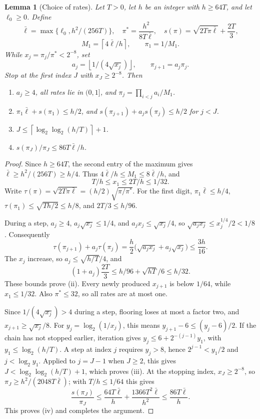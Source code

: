 \documentclass[11pt,letterpaper]{article}
\newtheorem{lemma}[theorem]{Lemma}
\theoremstyle{definition}
\theoremstyle{remark}
\newcommand{\ceil}[1]{\left\lceil #1\right\rceil}
\newcommand{\floor}[1]{\left\lfloor #1\right\rfloor}
\newcommand{\lgx}{\log_2}
\begin{document}
\begin{lemma}[Choice of rates]\label{lem:chain}
Let \(T>0\), let \(h\) be an integer with \(h\ge64T\), and let
\(\ell_0\ge0\). Define
\[
 \bar\ell=\max\{\ell_0,h^2/(256T)\},\quad
 \pi^*=\frac{h^2}{8T\bar\ell},\quad
 s(\pi)=\sqrt{2T\pi\bar\ell}+\frac{2T}{3},
\]
\[
 M_1=\ceil{4\bar\ell/h},\qquad \pi_1=1/M_1.
\]
While \(x_j=\pi_j/\pi^*<2^{-8}\), set
\[
 a_j=\floor{1/(4\sqrt{x_j})},\qquad \pi_{j+1}=a_j\pi_j.
\]
Stop at the first index \(J\) with \(x_J\ge2^{-8}\). Then
\begin{enumerate}[label=(\roman*)]
\item \(a_j\ge4\), all rates lie in \((0,1]\), and
\(\pi_j=\prod_{i<j}a_i/M_1\).
\item \(\pi_1\bar\ell+s(\pi_1)\le h/2\), and
\(s(\pi_{j+1})+a_js(\pi_j)\le h/2\) for \(j<J\).
\item \(J\le\ceil{\lgx\lgx(h/T)}+1\).
\item \(s(\pi_J)/\pi_J\le86T\bar\ell/h\).
\end{enumerate}
\end{lemma}
\begin{proof}
Since \(h\ge64T\), the second entry of the maximum gives
\(\bar\ell\ge h^2/(256T)\ge h/4\).
Thus \(4\bar\ell/h\le M_1\le8\bar\ell/h\), and
\[
 T/h\le x_1\le2T/h\le1/32.
\]
Write \(\tau(\pi)=\sqrt{2T\pi\bar\ell}
=(h/2)\sqrt{\pi/\pi^*}\).
For the first digit,
\(\pi_1\bar\ell\le h/4\),
\(\tau(\pi_1)\le\sqrt{Th/2}\le h/8\), and \(2T/3\le h/96\).

During a step, \(a_j\ge4\),
\(a_j\sqrt{x_j}\le1/4\), and
\(a_jx_j\le\sqrt{x_j}/4\), so \(\sqrt{a_jx_j}\le x_j^{1/4}/2<1/8\). Consequently
\[
 \tau(\pi_{j+1})+a_j\tau(\pi_j)
 =\frac h2\bigl(\sqrt{a_jx_j}+a_j\sqrt{x_j}\bigr)
 \le\frac{3h}{16}.
\]
The \(x_j\) increase, so
\(a_j\le\sqrt{h/T}/4\), and
\[
 (1+a_j)\frac{2T}{3}
 \le h/96+\sqrt{hT}/6\le h/32.
\]
These bounds prove (ii).
Every newly produced \(x_{j+1}\) is below \(1/64\), while
\(x_1\le1/32\). Also \(\pi^*\le32\), so all rates are at most one.

Since \(1/(4\sqrt{x_j})>4\) during a step, flooring loses at most
a factor two, and
\(x_{j+1}\ge\sqrt{x_j}/8\).
For \(y_j=\lgx(1/x_j)\), this means
\(y_{j+1}-6\le(y_j-6)/2\).
If the chain has not stopped earlier, iteration gives
\(y_j\le6+2^{-(j-1)}y_1\), with
\(y_1\le\lgx(h/T)\). A step at index \(j\) requires \(y_j>8\), hence
\(2^{j-1}<y_1/2\) and \(j<\lgx y_1\). Applied to \(j=J-1\) when
\(J\ge2\), this gives \(J<\lgx\lgx(h/T)+1\), which proves (iii).
At the stopping index, \(x_J\ge2^{-8}\), so
\(\pi_J\ge h^2/(2048T\bar\ell)\); with \(T/h\le1/64\) this gives
\[
 \frac{s(\pi_J)}{\pi_J}
 \le\frac{64T\bar\ell}{h}
       +\frac{1366T^2\bar\ell}{h^2}
 \le\frac{86T\bar\ell}{h}.
\]
This proves (iv) and completes the argument.
\end{proof}
\end{document}
